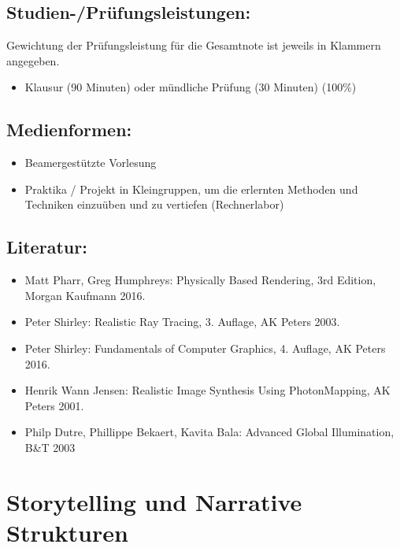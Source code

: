 \section*{Studien-/Prüfungsleistungen:}\label{studien-pruxfcfungsleistungen-16}

Gewichtung der Prüfungsleistung für die Gesamtnote ist jeweils in
Klammern angegeben.

\begin{itemize}
\tightlist
\item
  Klausur (90 Minuten) oder mündliche Prüfung (30 Minuten) (100\%)
\end{itemize}

\section*{Medienformen:}\label{medienformen-16}

\begin{itemize}
\tightlist
\item
  Beamergestützte Vorlesung
\item
  Praktika / Projekt in Kleingruppen, um die erlernten Methoden und
  Techniken einzuüben und zu vertiefen (Rechnerlabor)
\end{itemize}

\section*{Literatur:}\label{literatur-16}

\begin{itemize}
\tightlist
\item
  Matt Pharr, Greg Humphreys: Physically Based Rendering, 3rd Edition,
  Morgan Kaufmann 2016.
\item
  Peter Shirley: Realistic Ray Tracing, 3. Auflage, AK Peters 2003.
\item
  Peter Shirley: Fundamentals of Computer Graphics, 4. Auflage, AK
  Peters 2016.
\item
  Henrik Wann Jensen: Realistic Image Synthesis Using PhotonMapping, AK
  Peters 2001.
\item
  Philp Dutre, Phillippe Bekaert, Kavita Bala: Advanced Global
  Illumination, B\&T 2003
\end{itemize}

\chapter{Storytelling und Narrative
Strukturen}\label{storytelling-und-narrative-strukturen}

